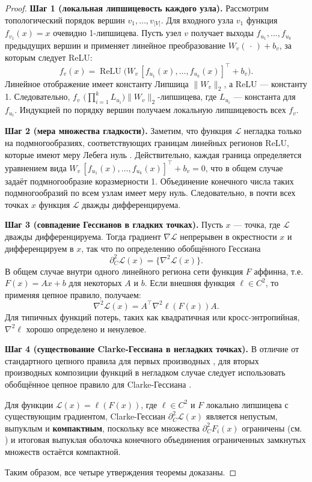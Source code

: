 \documentclass[11pt]{article}
\begin{document}
\begin{proof}
  \textbf{Шаг 1 (локальная липшицевость каждого узла).}
  Рассмотрим топологический порядок вершин $v_1,\dots,v_{|V|}$.
  Для входного узла $v_1$ функция~$f_{v_1}(x)=x$ очевидно 1-липшицева.
  Пусть узел $v$ получает выходы $f_{u_1},\dots,f_{u_k}$ предыдущих вершин
  и применяет линейное преобразование $W_v(\,\cdot\,)+b_v$, за которым следует ReLU:
  \[
    f_v(x)=\operatorname{ReLU}\!\bigl(W_v\,[f_{u_1}(x),\dots,f_{u_k}(x)]^{\!\top}+b_v\bigr).
  \]
  Линейное отображение имеет константу Липшица $\|W_v\|_2$, а ReLU — константу 1.
  Следовательно, $f_v$ $\bigl(\prod_{i=1}^k L_{u_i}\bigr)\|W_v\|_2$-липшицева,
  где $L_{u_i}$ — константа для $f_{u_i}$.
  Индукцией по порядку вершин получаем локальную липшицевость всех $f_v$.

  \medskip
  \textbf{Шаг 2 (мера множества гладкости).}
  Заметим, что функция $\mathcal L$ негладка только на подмногообразиях, соответствующих границам линейных
  регионов ReLU, которые имеют меру Лебега нуль \citep[Lemma 3.4]{pascanu2013revisiting}. Действительно,
  каждая граница определяется уравнением вида
  $W_v\,[f_{u_1}(x),\dots,f_{u_k}(x)]^{\!\top}+b_v = 0$, что в общем случае задаёт подмногообразие
  коразмерности 1. Объединение конечного числа таких подмногообразий по всем узлам имеет меру нуль.
  Следовательно, в почти всех точках $x$ функция $\mathcal L$ дважды дифференцируема.

  \medskip
  \textbf{Шаг 3 (совпадение Гессианов в гладких точках).}
  Пусть $x$ — точка, где $\mathcal L$ дважды дифференцируема.
  Тогда градиент $\nabla\mathcal L$ непрерывен в окрестности $x$ и дифференцируем в $x$,
  так что по определению обобщённого Гессиана
  \[
    \partial_C^{2}\mathcal L(x)=\bigl\{\nabla^{2}\mathcal L(x)\bigr\}.
  \]
  В общем случае внутри одного линейного региона сети функция $F$ аффинна, т.е. $F(x) = Ax + b$ для некоторых
  $A$ и $b$. Если внешняя функция $\ell \in C^2$, то применяя цепное правило, получаем:
  \[
    \nabla^2 \mathcal L(x) = A^\top \nabla^2 \ell(F(x)) A.
  \]
  Для типичных функций потерь, таких как квадратичная или кросс-энтропийная, $\nabla^2 \ell$ хорошо
  определено и ненулевое.

  \medskip
  \textbf{Шаг 4 (существование Clarke-Гессиана в негладких точках).}
  В отличие от стандартного цепного правила для первых производных \citep{bjarnason2005efficient}, для вторых
  производных композиции функций в негладком случае следует использовать обобщённое цепное правило для
  Clarke-Гессиана \citep{mordukhovich2012generalized, jeyakumar1999generalized}.

  Для функции $\mathcal L(x) = \ell(F(x))$, где $\ell \in C^2$ и $F$ локально липшицева с существующим
  градиентом, Clarke-Гессиан $\partial_C^2\mathcal L(x)$ является непустым, выпуклым и \textbf{компактным}, поскольку
  все множества $\partial_C^2F_i(x)$ ограничены (см. \cite[Thm 3.46]{mordukhovich2012generalized})
  и итоговая выпуклая оболочка конечного объединения ограниченных замкнутых множеств остаётся компактной.

  \medskip
  Таким образом, все четыре утверждения теоремы доказаны.
\end{proof}
\end{document}
